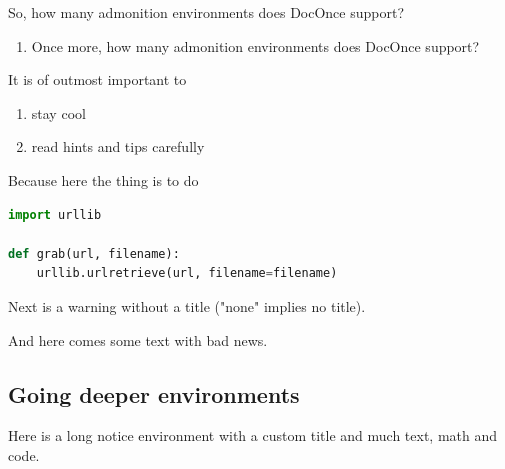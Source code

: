 \documentclass[%
oneside,                 %
final,                   %
10pt]{article}
\newenvironment{graybox2admon}[1][]{
\begin{graybox2mdframed}[frametitle=#1]
}
{
\end{graybox2mdframed}
}
\begin{document}
\begin{graybox2admon}[Question.]
So, how many admonition environments does DocOnce support?
\end{graybox2admon}





\begin{graybox2admon}[Question.]
\begin{enumerate}
 \item Once more, how many admonition environments does DocOnce support?
\end{enumerate}
\noindent
\end{graybox2admon}





\begin{graybox2admon}[Tip.]
It is of outmost important to
\begin{enumerate}
\item stay cool
\item read hints and tips carefully
\end{enumerate}
\noindent
Because here the thing is to do
\begin{lstlisting}[language=Python,style=simple,xleftmargin=2mm]
import urllib

def grab(url, filename):
    urllib.urlretrieve(url, filename=filename)

\end{lstlisting}
\end{graybox2admon}



Next is a warning without a title ("none" implies no title).


\begin{graybox2admon}[]
And here comes some text with bad news.
\end{graybox2admon}



\subsection{Going deeper environments}
Here is a long notice environment with a custom title and much
text, math and code.
\end{document}
